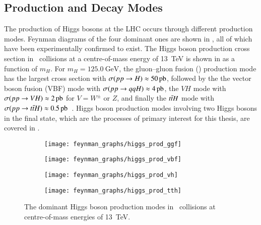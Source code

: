\subsection{Production and Decay Modes}

The production of Higgs bosons at the LHC occurs through different production
modes. Feynman diagrams of the four dominant ones are shown in
, all of which have been experimentally confirmed to
exist. The Higgs boson production cross section in \pp~collisions at a
centre-of-mass energy of \SI{13}{\TeV} is shown in  as
a function of $m_{H}$. For $m_{H} = \SI{125.0}{\GeV}$, the gluon--gluon fusion
(\ggF) production mode has the largest cross section with
$\sigma(\pp \to H) \approx \SI{50}{\pico\barn}$, followed by the the vector
boson fusion (VBF) mode with $\sigma(\pp \to qqH) \approx \SI{4}{\pico\barn}$,
the $VH$ mode with $\sigma(\pp \to VH) \approx \SI{2}{\pico\barn}$ for
$V = W^\pm$ or $Z$, and finally the $t\bar{t} H$ mode with
$\sigma(\pp \to \ttbar H) \approx
\SI{0.5}{\pico\barn}$~\cite{deFlorian:2016spz}.
Higgs boson production modes involving two Higgs bosons in the final state,
which are the processes of primary interest for this thesis, are covered in
.

\begin{figure}[htbp]
  \centering

  \begin{subfigure}{0.48\textwidth}
    \centering
    \texttt{[image: feynman\_graphs/higgs\_prod\_ggf]}
  \end{subfigure}%
  \begin{subfigure}{0.48\textwidth}
    \centering
    \texttt{[image: feynman\_graphs/higgs\_prod\_vbf]}
  \end{subfigure}

  \vspace*{0.5em}

  \begin{subfigure}{0.48\textwidth}
    \centering
    \texttt{[image: feynman\_graphs/higgs\_prod\_vh]}
  \end{subfigure}%
  \begin{subfigure}{0.48\textwidth}
    \centering
    \texttt{[image: feynman\_graphs/higgs\_prod\_tth]}
  \end{subfigure}%

  \caption[Higgs boson production modes in \pp~collisions.]{The dominant Higgs
    boson production modes in \pp~collisions at centre-of-mass energies of
    \SI{13}{\TeV}.}%
  \label{fig:higgs_prod_feyn}
\end{figure}


